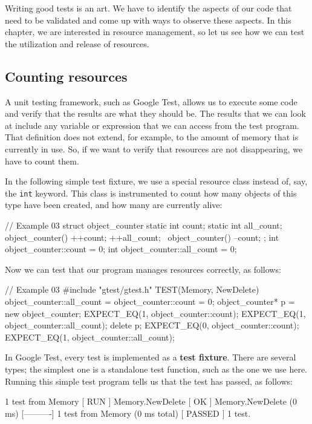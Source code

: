 Writing good tests is an art. We have to identify the aspects of our code that need to be validated and come up with ways to observe these aspects. In this chapter, we are interested in resource management, so let us see how we can test the utilization and release of resources.

\subsection{Counting resources}

A unit testing framework, such as Google Test, allows us to execute some code and verify that the results are what they should be. The results that we can look at include any variable or expression that we can access from the test program. That definition does not extend, for example, to the amount of memory that is currently in use. So, if we want to verify that resources are not disappearing, we have to count them.

In the following simple test fixture, we use a special resource class instead of, say, the \texttt{int} keyword. This class is instrumented to count how many objects of this type have been created, and how many are currently alive:

\begin{code}
// Example 03
struct object_counter {
  static int count;
  static int all_count;
  object_counter() { ++count; ++all_count; }
  ~object_counter() { --count; }
};
int object_counter::count = 0;
int object_counter::all_count = 0;
\end{code}

Now we can test that our program manages resources correctly, as follows:

\begin{code}
// Example 03
#include "gtest/gtest.h"
TEST(Memory, NewDelete) {
  object_counter::all_count = object_counter::count = 0;
  object_counter* p = new object_counter;
  EXPECT_EQ(1, object_counter::count);
  EXPECT_EQ(1, object_counter::all_count);
  delete p;
  EXPECT_EQ(0, object_counter::count);
  EXPECT_EQ(1, object_counter::all_count);
}
\end{code}

In Google Test, every test is implemented as a \textbf{test fixture}. There are several types; the simplest one is a standalone test function, such as the one we use here. Running this simple test program tells us that the test has passed, as follows:

\begin{code}
[----------] 1 test from Memory
[ RUN      ] Memory.NewDelete
[       OK ] Memory.NewDelete (0 ms)
[----------] 1 test from Memory (0 ms total)
[  PASSED  ] 1 test.
\end{code}

